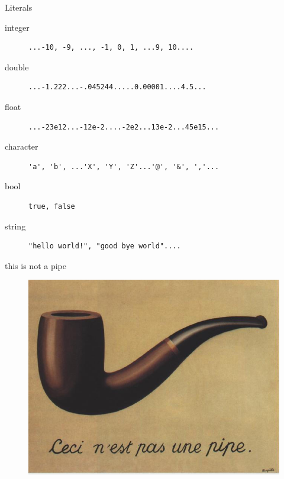 \documentclass[xcolor={dvipsnames}]{beamer}
\begin{document}
\begin{frame}[fragile]{Literals}
\begin{description}
\item [integer]
\begin{verbatim}	
...-10, -9, ..., -1, 0, 1, ...9, 10....
\end{verbatim}
\item [double]
\begin{verbatim}
...-1.222...-.045244.....0.00001....4.5...
\end{verbatim}
\item [float] 
\begin{verbatim}	
...-23e12...-12e-2....-2e2...13e-2...45e15...
\end{verbatim}
\item [character]
\begin{verbatim}
'a', 'b', ...'X', 'Y', 'Z'...'@', '&', ','...
\end{verbatim}
\item [bool]
\begin{verbatim}	
true, false
\end{verbatim}
\item[string]
\begin{verbatim}
"hello world!", "good bye world".... 
\end{verbatim}
\end{description}
\end{frame}

\begin{frame}{this is not a pipe}
\begin{figure}
		\href{http://www.tcf.ua.edu/Classes/Jbutler/T311/Modernism.htm}{\includegraphics[width=1\textwidth]{MagrittePipe}}
	\end{figure}
\end{frame}
\end{document}
